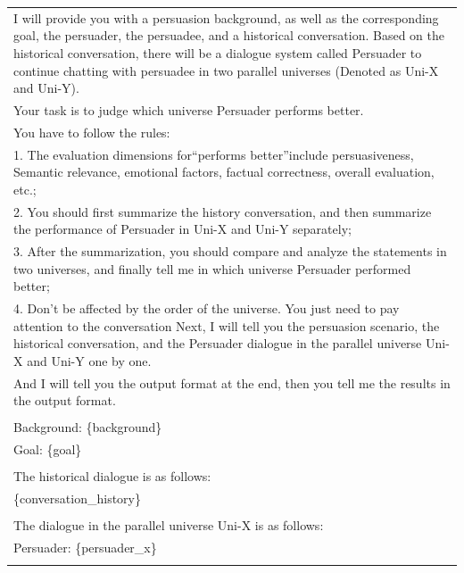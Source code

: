 \begin{table}[ht]
    \centering
    \footnotesize
    \begin{tabular}{p{15cm}}
        \toprule
        I will provide you with a persuasion background, as well as the corresponding goal, the persuader, the persuadee, and a historical conversation. Based on the historical conversation, there will be a dialogue system called Persuader to continue chatting with persuadee in two parallel universes (Denoted as Uni-X and Uni-Y). \\
        Your task is to judge which universe Persuader performs better. \\
        You have to follow the rules: \\
        1. The evaluation dimensions for``performs better''include persuasiveness, Semantic relevance, emotional factors, factual correctness, overall evaluation, etc.; \\
        2. You should first summarize the history conversation, and then summarize the performance of Persuader in Uni-X and Uni-Y separately; \\
        3. After the summarization, you should compare and analyze the statements in two universes, and finally tell me in which universe Persuader performed better; \\
        4. Don't be affected by the order of the universe. You just need to pay attention to the conversation
        Next, I will tell you the persuasion scenario, the historical conversation, and the Persuader dialogue in the parallel universe Uni-X and Uni-Y one by one. \\
        And I will tell you the output format at the end, then you tell me the results in the output format. \\
        \\
        Background: \{background\} \\
        Goal: \{goal\} \\
        \\
        The historical dialogue is as follows: \\
        \{conversation\_history\} \\
         \\
        The dialogue in the parallel universe Uni-X is as follows: \\
        Persuader: \{persuader\_x\} \\
         \\ 

\end{tabular}
\end{table}
